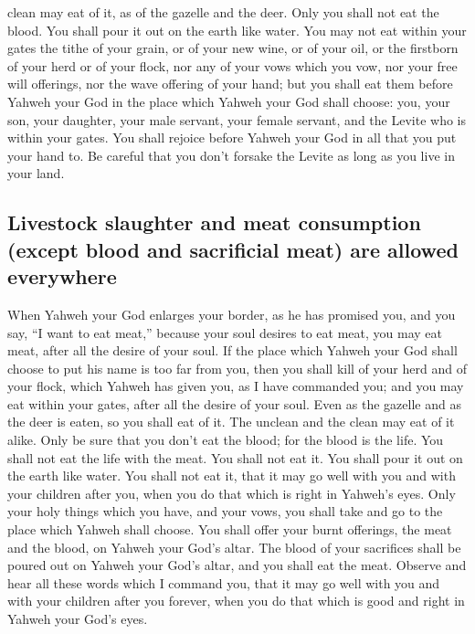 clean may eat of it, as of the gazelle and the deer. 
Only you shall not eat the blood. You shall pour it out on the earth
like water.  You may not eat within your gates the tithe
of your grain, or of your new wine, or of your oil, or the firstborn of
your herd or of your flock, nor any of your vows which you vow, nor your
free will offerings, nor the wave offering of your hand; 
but you shall eat them before Yahweh your God in the place which Yahweh
your God shall choose: you, your son, your daughter, your male servant,
your female servant, and the Levite who is within your gates. You shall
rejoice before Yahweh your God in all that you put your hand to.
 Be careful that you don't forsake the Levite as long as
you live in your land.

\hypertarget{livestock-slaughter-and-meat-consumption-except-blood-and-sacrificial-meat-are-allowed-everywhere}{%
\subsection{Livestock slaughter and meat consumption (except blood and
sacrificial meat) are allowed
everywhere}\label{livestock-slaughter-and-meat-consumption-except-blood-and-sacrificial-meat-are-allowed-everywhere}}

 When Yahweh your God enlarges your border, as he has
promised you, and you say, ``I want to eat meat,'' because your soul
desires to eat meat, you may eat meat, after all the desire of your
soul.  If the place which Yahweh your God shall choose to
put his name is too far from you, then you shall kill of your herd and
of your flock, which Yahweh has given you, as I have commanded you; and
you may eat within your gates, after all the desire of your soul.
 Even as the gazelle and as the deer is eaten, so you
shall eat of it. The unclean and the clean may eat of it alike.
 Only be sure that you don't eat the blood; for the blood
is the life. You shall not eat the life with the meat. 
You shall not eat it. You shall pour it out on the earth like water.
 You shall not eat it, that it may go well with you and
with your children after you, when you do that which is right in
Yahweh's eyes.  Only your holy things which you have, and
your vows, you shall take and go to the place which Yahweh shall choose.
 You shall offer your burnt offerings, the meat and the
blood, on Yahweh your God's altar. The blood of your sacrifices shall be
poured out on Yahweh your God's altar, and you shall eat the meat.
 Observe and hear all these words which I command you,
that it may go well with you and with your children after you forever,
when you do that which is good and right in Yahweh your God's eyes.

